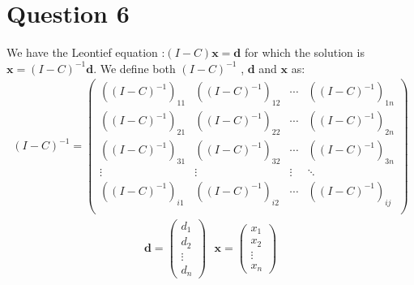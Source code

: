 \documentclass[12pt]{article}
\begin{document}
\section{Question 6}
We have the Leontief equation :$(I-C)\textbf{x}=\textbf{d}$ for which the solution is $\textbf{x}=(I-C)^{-1}\textbf{d}$.
We define both $(I-C)^{-1}$ , $\textbf{d}$ and $\textbf{x}$ as:
\begin{align*}
(I-C)^{-1}=
\left(\begin{array}{cccccc|c}
     ((I-C)^{-1})_{11}  &   ((I-C)^{-1})_{12}  &      \cdots  &  ((I-C)^{-1})_{1n}  \\
     ((I-C)^{-1})_{21}  &   ((I-C)^{-1})_{22}  &      \cdots  &  ((I-C)^{-1})_{2n}  \\
     ((I-C)^{-1})_{31}  &   ((I-C)^{-1})_{32}  &     \cdots  &  ((I-C)^{-1})_{3n}  \\ 
     \vdots          &   \vdots  &   \vdots   &   \ddots  \\
     ((I-C)^{-1})_{i1}  &  ((I-C)^{-1})_{i2}  &     \cdots  &   ((I-C)^{-1})_{ij}  \\ 
\end{array}\right)
\end{align*}
\begin{align*}
\textbf{d}= 
\left(\begin{array}{c}
d_1\\
d_2\\
\vdots \\
d_n
\end{array}\right)
\text{   }
\textbf{x}= 
\left(\begin{array}{c}
x_1\\
x_2\\
\vdots \\
x_n
\end{array}\right)
\end{align*}
\end{document}
